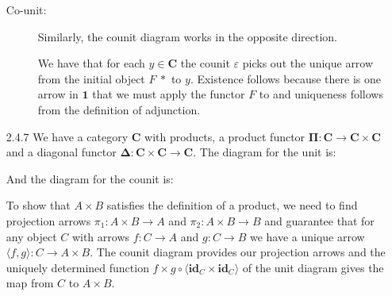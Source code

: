 \documentclass{article}
\newcommand{\one}{\mathbf{1}}
\newcommand{\cat}{\mathbf{C}}
\newcommand{\id}{\mathbf{id}}
\newcommand{\pifun}{\mathbf{\Pi}}
\newcommand{\diagfun}{\mathbf{\Delta}}
\begin{document}
\begin{enumerate}
\begin{description}
  \item[]
  \item [Co-unit:]
    Similarly, the counit diagram works in the opposite direction.
    \begin{center}
    \end{center}
    We have that for each $y \in \cat$ the counit $\varepsilon$ picks out the unique arrow from the initial object $F~*$ to $y$.
    Existence follows because there is one arrow in $\one$ that we must apply the functor $F$ to and uniqueness follows from the definition of adjunction.
  \end{description}
\item[]
\item[2.4.7]
  We have a category $\cat$ with products, a product functor $\pifun : \cat \rightarrow \cat \times \cat$ and a diagonal functor $\diagfun : \cat \times \cat \rightarrow \cat$.
  The diagram for the unit is:
  \begin{center}
  \end{center}

  And the diagram for the counit is:
  \begin{center}
  \end{center}
  To show that $A \times B$ satisfies the definition of a product, we need to find projection arrows $\pi_1 : A \times B \rightarrow A$ and $\pi_2 : A \times B \rightarrow B$ and guarantee that for any object $C$ with arrows $f : C \rightarrow A$ and $g : C \rightarrow B$ we have a unique arrow $\langle f, g \rangle : C \rightarrow A \times B$.
  The counit diagram provides our projection arrows and the uniquely determined function $f \times g \circ \langle \id_C \times \id_C \rangle$ of the unit diagram gives the map from $C$ to $A \times B$.
\end{enumerate}
\end{document}
